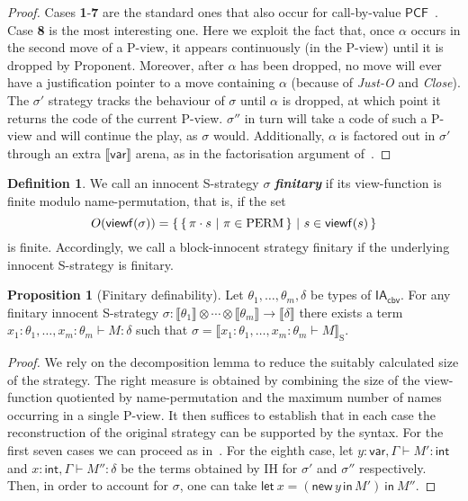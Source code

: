 \documentclass{CSML}
\theoremstyle{definition}\newtheorem{definition}[thm]{Definition}
\theoremstyle{definition}\newtheorem{example}[thm]{Example}
\theoremstyle{definition}\newtheorem{proposition}[thm]{Proposition}
\theoremstyle{definition}\newtheorem{lemma}[thm]{Lemma}
\theoremstyle{definition}\newtheorem{theorem}[thm]{Theorem}
\theoremstyle{definition}\newtheorem{corollary}[thm]{Corollary}
\theoremstyle{definition}\newtheorem{remark}[thm]{Remark}
\newcommand\arr{\rightarrow}
\newcommand\viewf{\mathsf{viewf}}
\newcommand\boldemph[1]{\emph{\textbf{#1}}}
\newcommand{\permg}{{\rm PERM}}
\newcommand\pcf{\mathsf{PCF}}
\newcommand\iacbv{\mathsf{IA}_{\mathsf{cbv}}}
\newcommand\letin[2]{\mathsf{let}\ #1\ \mathsf{in}\ #2}
\newcommand\expt{\mathsf{int}}
\newcommand\vart{\mathsf{var}}
\newcommand\makeset[1]{\{\,#1\,\}}
\newcommand\sem[1]{\llbracket #1 \rrbracket}
\newcommand\ssem[1]{\sem{#1}_{\mathrm{S}}}
\newcommand\seq[2]{{#1} \vdash {#2}}
\newcommand\new[2]{\mathsf{new}\,#1\,\mathsf{in}\,#2}
\begin{document}
\begin{proof}
Cases {\bf1}-{\bf7} are the standard ones that also occur for call-by-value $\pcf$~\cite{HY97}.
Case {\bf8} is the most interesting one. Here we exploit the fact that, once $\alpha$ occurs
in the second move of a P-view, it appears continuously (in the P-view) until it is dropped by Proponent.
Moreover, after $\alpha$ has been dropped, no move will ever have a justification pointer
to a move containing $\alpha$ (because of {\em Just-O} and {\em Close}). 
The $\sigma'$ strategy tracks the behaviour of $\sigma$
until $\alpha$ is dropped, at which point it returns the code of the current P-view.
$\sigma''$ in turn will take a code of such a P-view and will continue the play, 
as $\sigma$ would. Additionally, $\alpha$ is factored out  in $\sigma'$ through
an extra $\sem{\vart}$ arena, as in the factorisation argument of~\cite{AM97a}.
\end{proof}
\begin{definition}
We call an innocent S-strategy $\sigma$ \boldemph{finitary} if its view-function is finite modulo name-permutation, that is, if the set
\[
O(\viewf(\sigma)) = \makeset{\makeset{\pi\cdot s\ |\ \pi\in\permg}\ |\ s\in\viewf(s)}
\]
is finite. Accordingly, we call a block-innocent strategy finitary if the underlying innocent S-strategy is finitary.
\end{definition}
\begin{proposition}[Finitary definability]\label{prop:defin}
Let $\theta_1,\dots,\theta_m,\delta$ be types of $\iacbv$. For any finitary
innocent S-strategy $\sigma:\sem{\theta_1}\otimes\cdots\otimes\sem{\theta_m}\arr\sem{\delta}$ there exists a term $x_1:\theta_1,\dots,x_m:\theta_m\vdash M:\delta$ such that 
$\sigma=\ssem{\seq{x_1:\theta_1,\dots,x_m:\theta_m}{M}}$.
\end{proposition}
\begin{proof}
We rely on the decomposition lemma to reduce the suitably calculated size of the strategy.
The right measure is obtained by combining the size of the view-function quotiented by
name-permutation and the maximum number of names occurring in a single P-view.
It then suffices to establish that in  each case 
the reconstruction of the original strategy can be supported by the syntax.
For the first seven cases we can proceed as in~\cite{HY97}.
For the eighth case,
let $\seq{y:\vart, \Gamma}{M':\expt}$ and $\seq{x:\expt, \Gamma}{M'':\delta}$
be the terms obtained by IH for $\sigma'$ and $\sigma''$ respectively.
Then, in order to account for $\sigma$,  one can take $\letin{x=(\new{y}{M'})}{M''}$.
\end{proof}
\end{document}
